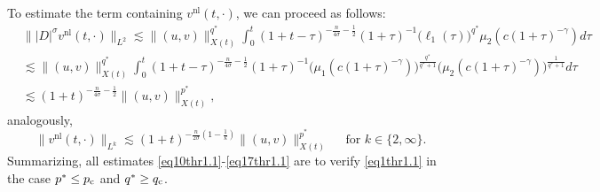 \documentclass[11pt,reqno]{amsart}
\newcommand{\tron}[1]{\left( #1 \right)}
\numberwithin{equation}{section}
\begin{document}
To estimate the term containing $v^{\mathrm{nl}}(t,\cdot)$, we can proceed as follows:
\begin{align}
&\big\||D|^{\sigma}v^{\mathrm{nl}}(t, \cdot)\big\|_{L^2}\lesssim\|(u, v)\|_{X(t)}^{q^*} \int_0^t(1+t-\tau)^{-\frac{n}{4\sigma}-\frac{1}{2}}(1+\tau)^{-1} \big(\ell_1(\tau)\big)^{q^*} \mu_2\left(c(1+\tau)^{-\gamma}\right) d\tau \nonumber\\
& \lesssim\|(u, v)\|_{X(t)}^{q^*}\int_0^t(1+t-\tau)^{-\frac{n}{4\sigma}-\frac{1}{2}}(1+\tau)^{-1}\big(\mu_1\left(c(1+\tau)^{-\gamma}\right)\big)^{\frac{q^*}{q^*+1}}\big(\mu_2\left(c(1+\tau)^{-\gamma}\right)\big)^{\frac{1}{q^*+1}} d \tau\nonumber\\
&\lesssim(1+t)^{-\frac{n}{4\sigma}-\frac{1}{2}}\|(u, v)\|_{X(t)}^{p^*}, \label{eq16thr1.1}
\end{align}
analogously, 
\begin{equation}\label{eq17thr1.1}
\big\|v^{\mathrm{nl}}(t,\cdot)\big\|_{L^k}\lesssim (1+t)^{-\frac{n}{2\sigma}\tron{1-\frac{1}{k}}}\|(u,v)\|^{p^*}_{X(t)} \quad \text{ for }k\in\{2,\infty\}.
\end{equation}
Summarizing, all estimates \eqref{eq10thr1.1}-\eqref{eq17thr1.1} are to verify \eqref{eq1thr1.1} in the case $p^*\leq p_{\rm c}$ and $q^*\geq q_{\rm c}$. \medskip
\end{document}
